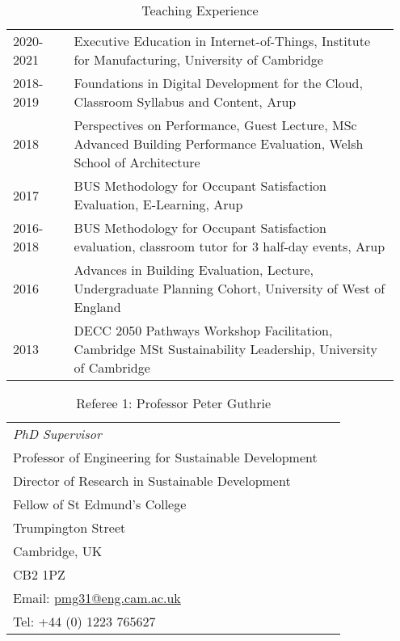 \documentclass[11pt, oneside]{article}   	%
\begin{document}
\begin{table}[h]
\vspace{-5mm}
\caption*{Teaching Experience}
\vspace{-5mm}
\small
\begin{center}
\begin{tabular}{p{0.15\linewidth} p{0.8\linewidth}}
\hline
2020-2021&Executive Education in Internet-of-Things, Institute for Manufacturing, University of Cambridge\\
2018-2019&Foundations in Digital Development for the Cloud, Classroom Syllabus and Content, Arup\\
2018&Perspectives on Performance, Guest Lecture, MSc Advanced Building Performance Evaluation, Welsh School of Architecture\\
2017&BUS Methodology for Occupant Satisfaction Evaluation, E-Learning, Arup\\
2016-2018&BUS Methodology for Occupant Satisfaction evaluation, classroom tutor for 3 half-day events, Arup\\
2016&Advances in Building Evaluation, Lecture, Undergraduate Planning Cohort, University of West of England\\
2013&DECC 2050 Pathways Workshop Facilitation, Cambridge MSt Sustainability Leadership, University of Cambridge\\
\hline
\end{tabular}
\end{center}
\vspace{-10mm}
\end{table}

\pagebreak


\begin{table}[h]
\vspace{-5mm}
\caption*{Referee 1: Professor Peter Guthrie}
\vspace{-5mm}
\small
\begin{center}
\begin{tabular}{p{0.95\linewidth}}
\hline
\emph{PhD Supervisor}\\
Professor of Engineering for Sustainable Development\\
Director of Research in Sustainable Development\\
Fellow of St Edmund's College\\
Trumpington Street\\
Cambridge, UK\\
CB2 1PZ\\
Email: \href{mailto:pmg31@eng.cam.ac.uk}{pmg31@eng.cam.ac.uk}\\
Tel: +44 (0) 1223 765627\\
\hline
\end{tabular}
\end{center}
\vspace{-10mm}
\end{table}
\end{document}

